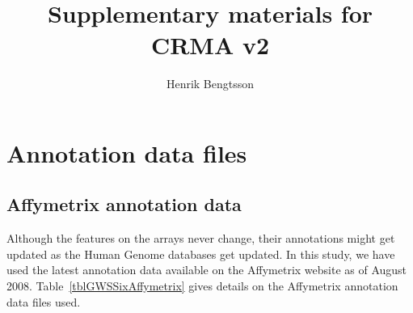 \documentclass[10pt,a4paper]{article}
\begin{document}
\title{Supplementary materials for CRMA v2}
\author{Henrik Bengtsson}
\maketitle
\tableofcontents

\clearpage
\section{Annotation data files}

\subsection{Affymetrix annotation data}
Although the features on the arrays never change, their annotations might get updated as the Human Genome databases get updated.  In this study, we have used the latest annotation data available on the Affymetrix website as of August 2008.
 Table~\ref{tblGWSSixAffymetrix} gives details on the Affymetrix annotation data files used.
\end{document}
